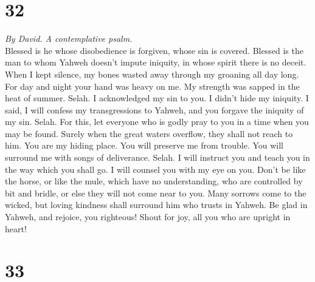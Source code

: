 \hypertarget{section-31}{%
\section{32}\label{section-31}}

\emph{By David. A contemplative psalm.}\\
 Blessed is he whose disobedience is forgiven, whose sin
is covered.  Blessed is the man to whom Yahweh doesn't
impute iniquity, in whose spirit there is no deceit.  When
I kept silence, my bones wasted away through my groaning all day long.
 For day and night your hand was heavy on me. My strength
was sapped in the heat of summer. Selah.  I acknowledged
my sin to you. I didn't hide my iniquity. I said, I will confess my
transgressions to Yahweh, and you forgave the iniquity of my sin. Selah.
 For this, let everyone who is godly pray to you in a time
when you may be found. Surely when the great waters overflow, they shall
not reach to him.  You are my hiding place. You will
preserve me from trouble. You will surround me with songs of
deliverance. Selah.  I will instruct you and teach you in
the way which you shall go. I will counsel you with my eye on you.
 Don't be like the horse, or like the mule, which have no
understanding, who are controlled by bit and bridle, or else they will
not come near to you.  Many sorrows come to the wicked,
but loving kindness shall surround him who trusts in Yahweh.
 Be glad in Yahweh, and rejoice, you righteous! Shout for
joy, all you who are upright in heart!

\hypertarget{section-32}{%
\section{33}\label{section-32}}

